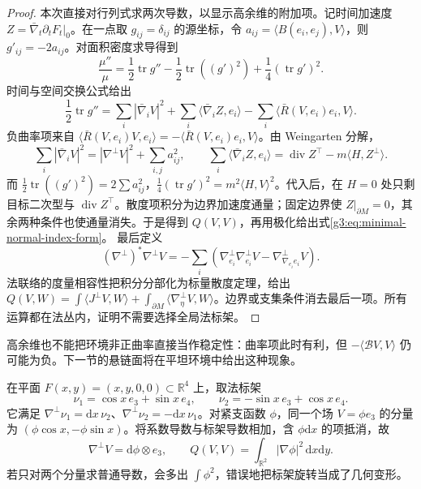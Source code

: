 \begin{proof}
	本次直接对行列式求两次导数，以显示高余维的附加项。记时间加速度 \(Z=\bar\nabla_t\partial_tF_t|_0\)。在一点取 \(g_{ij}=\delta_{ij}\) 的源坐标，令 \(a_{ij}=\langle B(e_i,e_j),V\rangle\)，则 \(g'_{ij}=-2a_{ij}\)。对面积密度求导得到
	\[
		\frac{\mu''}{\mu}
		=\frac12\operatorname{tr}g''-
		\frac12\operatorname{tr}((g')^2)
		+\frac14(\operatorname{tr}g')^2.
	\]
	时间与空间交换公式给出
	\[
		\frac12\operatorname{tr}g''
		=\sum_i|\bar\nabla_iV|^2+
		\sum_i\langle\bar\nabla_iZ,e_i\rangle
		-\sum_i\langle\bar R(V,e_i)e_i,V\rangle.
	\]
	负曲率项来自 \(\langle\bar R(V,e_i)V,e_i\rangle=-\langle\bar R(V,e_i)e_i,V\rangle\)。由 Weingarten 分解，
	\[
		\sum_i|\bar\nabla_iV|^2=|\nabla^\perp V|^2+\sum_{i,j}a_{ij}^2,
		\qquad
		\sum_i\langle\bar\nabla_iZ,e_i\rangle
		=\operatorname{div}Z^\top-m\langle H,Z^\perp\rangle.
	\]
	而 \(\frac12\operatorname{tr}((g')^2)=2\sum a_{ij}^2\)，\(\frac14(\operatorname{tr}g')^2=m^2\langle H,V\rangle^2\)。代入后，在 \(H=0\) 处只剩目标二次型与 \(\operatorname{div}Z^\top\)。散度项积分为边界加速度通量；固定边界使 \(Z|_{\partial M}=0\)，其余两种条件也使通量消失。于是得到 \(Q(V,V)\)，再用极化给出式\eqref{g3:eq:minimal-normal-index-form}。
	最后定义
	\[
		(\nabla^\perp)^*\nabla^\perp V
		=-\sum_i\left(\nabla^\perp_{e_i}\nabla^\perp_{e_i}V
		-\nabla^\perp_{\nabla_{e_i}e_i}V\right).
	\]
	法联络的度量相容性把积分分部化为标量散度定理，给出
	\(Q(V,W)=\int\langle J^\perp V,W\rangle+\int_{\partial M}\langle\nabla^\perp_\eta V,W\rangle\)。边界或支集条件消去最后一项。所有运算都在法丛内，证明不需要选择全局法标架。
\end{proof}

高余维也不能把环境非正曲率直接当作稳定性：曲率项此时有利，但 \(-\langle\mathcal BV,V\rangle\) 仍可能为负。下一节的悬链面将在平坦环境中给出这种现象。

\begin{example}\label{g3:exm:rotating-normal-frame-energy}
	在平面 \(F(x,y)=(x,y,0,0)\subset\mathbb R^4\) 上，取法标架
	\[
		\nu_1=\cos x\,e_3+\sin x\,e_4,
		\qquad \nu_2=-\sin x\,e_3+\cos x\,e_4.
	\]
	它满足 \(\nabla^\perp\nu_1=\mathrm dx\,\nu_2\)、\(\nabla^\perp\nu_2=-\mathrm dx\,\nu_1\)。对紧支函数 \(\phi\)，同一个场 \(V=\phi e_3\) 的分量为 \((\phi\cos x,-\phi\sin x)\)。将系数导数与标架导数相加，含 \(\phi\mathrm dx\) 的项抵消，故
	\[
		\nabla^\perp V=\mathrm d\phi\otimes e_3,
		\qquad Q(V,V)=\int_{\mathbb R^2}|\nabla\phi|^2\,\mathrm dx\mathrm dy.
	\]
	若只对两个分量求普通导数，会多出 \(\int\phi^2\)，错误地把标架旋转当成了几何变形。
\end{example}
